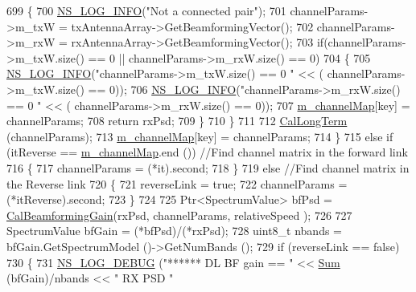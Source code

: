 \begin{DoxyCode}
699                 \{
700                         \hyperlink{group__logging_gafbd73ee2cf9f26b319f49086d8e860fb}{NS\_LOG\_INFO}(\textcolor{stringliteral}{"Not a connected pair"});
701                         channelParams->m\_txW = txAntennaArray->GetBeamformingVector();
702                         channelParams->m\_rxW = rxAntennaArray->GetBeamformingVector();
703                         \textcolor{keywordflow}{if}(channelParams->m\_txW.size() == 0 || channelParams->m\_rxW.size() == 0)
704                         \{
705                                 \hyperlink{group__logging_gafbd73ee2cf9f26b319f49086d8e860fb}{NS\_LOG\_INFO}(\textcolor{stringliteral}{"channelParams->m\_txW.size() == 0 "} << (
      channelParams->m\_txW.size() == 0));
706                                 \hyperlink{group__logging_gafbd73ee2cf9f26b319f49086d8e860fb}{NS\_LOG\_INFO}(\textcolor{stringliteral}{"channelParams->m\_rxW.size() == 0 "} << (
      channelParams->m\_rxW.size() == 0));
707                                 \hyperlink{classns3_1_1MmWave3gppChannel_a31f05f0c8a438b8ce89f29813e863040}{m\_channelMap}[key] = channelParams;
708                                 \textcolor{keywordflow}{return} rxPsd;
709                         \}
710                 \}
711 
712                 \hyperlink{classns3_1_1MmWave3gppChannel_ab1cacdfc31ed5b10bc2dc5206153ec57}{CalLongTerm} (channelParams);
713                 \hyperlink{classns3_1_1MmWave3gppChannel_a31f05f0c8a438b8ce89f29813e863040}{m\_channelMap}[key] = channelParams;
714         \}
715         \textcolor{keywordflow}{else} \textcolor{keywordflow}{if} (itReverse == \hyperlink{classns3_1_1MmWave3gppChannel_a31f05f0c8a438b8ce89f29813e863040}{m\_channelMap}.end ()) \textcolor{comment}{//Find channel matrix in the forward link}
716         \{
717                 channelParams = (*it).second;
718         \}
719         \textcolor{keywordflow}{else} \textcolor{comment}{//Find channel matrix in the Reverse link}
720         \{
721                 reverseLink = \textcolor{keyword}{true};
722                 channelParams = (*itReverse).second;
723         \}
724 
725         Ptr<SpectrumValue> bfPsd = \hyperlink{classns3_1_1MmWave3gppChannel_acd8bc1db086ba52b0e77ed71a6ccb56d}{CalBeamformingGain}(rxPsd, channelParams, relativeSpeed
      );
726 
727         SpectrumValue bfGain = (*bfPsd)/(*rxPsd);
728         uint8\_t nbands = bfGain.GetSpectrumModel ()->GetNumBands ();
729         \textcolor{keywordflow}{if} (reverseLink == \textcolor{keyword}{false})
730         \{
731                 \hyperlink{group__logging_ga413f1886406d49f59a6a0a89b77b4d0a}{NS\_LOG\_DEBUG} (\textcolor{stringliteral}{"****** DL BF gain == "} << \hyperlink{namespacens3_afad5475661952172fe6ef1260360dad8}{Sum} (bfGain)/nbands << \textcolor{stringliteral}{" RX PSD "} 

\end{DoxyCode}
